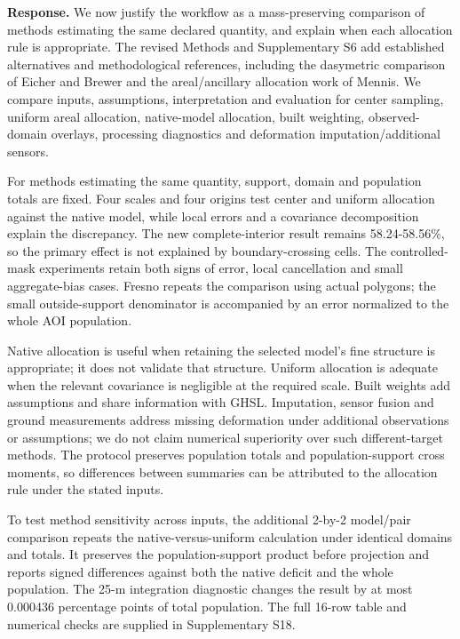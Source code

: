 \documentclass[11pt,a4paper]{article}
\begin{document}
\textbf{Response.} We now justify the workflow as a mass-preserving comparison of methods estimating the same declared quantity, and explain when each allocation rule is appropriate. The revised Methods and Supplementary S6 add established alternatives and methodological references, including the dasymetric comparison of Eicher and Brewer and the areal/ancillary allocation work of Mennis. We compare inputs, assumptions, interpretation and evaluation for center sampling, uniform areal allocation, native-model allocation, built weighting, observed-domain overlays, processing diagnostics and deformation imputation/additional sensors.

For methods estimating the same quantity, support, domain and population totals are fixed. Four scales and four origins test center and uniform allocation against the native model, while local errors and a covariance decomposition explain the discrepancy. The new complete-interior result remains 58.24-58.56\%, so the primary effect is not explained by boundary-crossing cells. The controlled-mask experiments retain both signs of error, local cancellation and small aggregate-bias cases. Fresno repeats the comparison using actual polygons; the small outside-support denominator is accompanied by an error normalized to the whole AOI population.

Native allocation is useful when retaining the selected model's fine structure is appropriate; it does not validate that structure. Uniform allocation is adequate when the relevant covariance is negligible at the required scale. Built weights add assumptions and share information with GHSL. Imputation, sensor fusion and ground measurements address missing deformation under additional observations or assumptions; we do not claim numerical superiority over such different-target methods. The protocol preserves population totals and population-support cross moments, so differences between summaries can be attributed to the allocation rule under the stated inputs.

To test method sensitivity across inputs, the additional 2-by-2 model/pair comparison repeats the native-versus-uniform calculation under identical domains and totals. It preserves the population-support product before projection and reports signed differences against both the native deficit and the whole population. The 25-m integration diagnostic changes the result by at most 0.000436 percentage points of total population. The full 16-row table and numerical checks are supplied in Supplementary S18.
\end{document}
